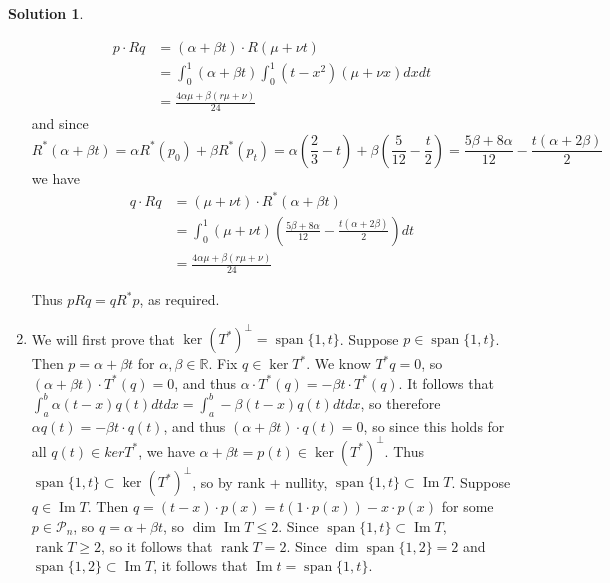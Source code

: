 \documentclass[11pt]{article}
\theoremstyle{definition}
\newtheorem*{solution}{Solution}
\newcommand{\R}{\mathbb{R}}
\DeclareMathOperator{\spn}{span}
\DeclareMathOperator{\rank}{rank}
\DeclareMathOperator{\im}{Im}
\newcommand{\poly}{\mathcal{P}}
\begin{document}
\begin{solution}
\begin{enumerate}[label = \alph*)]
            \begin{align*}
                p \cdot Rq &= (\alpha + \beta t) \cdot R (\mu + \nu t)\\
                &= \int_0^1 (\alpha + \beta t) \int_0^1 (t - x^2) (\mu + \nu x) dx dt\\
                &= \frac{4 \alpha \mu + \beta (r \mu + \nu)}{24}
            \end{align*}
            and since $$R^*(\alpha + \beta t) = \alpha R^*(p_0) + \beta R^*(p_t) = \alpha (\frac{2}{3}-t) + \beta(\frac{5}{12} - \frac{t}{2}) = \frac{5\beta + 8 \alpha}{12} - \frac{t(\alpha+2\beta)}{2}$$we have
            \begin{align*}
                q \cdot Rq &= (\mu + \nu t) \cdot R^* (\alpha + \beta t)\\
                &= \int_0^1 (\mu + \nu t) \left(\frac{5\beta + 8 \alpha}{12} - \frac{t(\alpha+2\beta)}{2}\right)dt\\
                &= \frac{4 \alpha \mu + \beta (r \mu + \nu)}{24}
            \end{align*}

            Thus $p Rq = q R^* p$, as required.
            \item We will first prove that $\ker (T^*)^{\perp} = \spn\{1, t\}$. Suppose $p \in \spn\{1, t\}$. Then $p = \alpha + \beta t$ for $\alpha, \beta \in \R$. Fix $q \in \ker T^*$. We know $T^* q = 0$, so $(\alpha + \beta t) \cdot T^*(q) = 0$, and thus $\alpha \cdot  T^*(q) = -\beta t \cdot T^*(q)$. It follows that $\int_a^b\alpha (t-x) q(t)dt dx = \int_a^b -\beta (t-x) q(t)dt dx$, so therefore $\alpha q(t) = -\beta t \cdot q(t)$, and thus $(\alpha + \beta t) \cdot q(t) = 0$, so since this holds for all $q(t) \in ker T^*$, we have $\alpha + \beta t = p(t) \in \ker (T^*)^{\perp}$. Thus $\spn\{1, t\} \subset \ker (T^*)^{\perp}$, so by rank + nullity, $\spn\{1, t\} \subset \im T$. Suppose $q \in \im T$. Then $q = (t-x) \cdot p(x) = t (1 \cdot p(x)) - x \cdot p(x)$ for some $p \in \poly_n$, so $q = \alpha + \beta t$, so $\dim \im T \le 2$. Since $\spn\{1, t\} \subset \im T$, $\rank T \ge 2$, so it follows that $\rank T = 2$. Since $\dim \spn\{1,2\} =2 $ and $\spn\{1,2\} \subset \im T$, it follows that $\im t = \spn\{1,t\}$.
        \end{enumerate}
    \end{solution}
\end{document}
